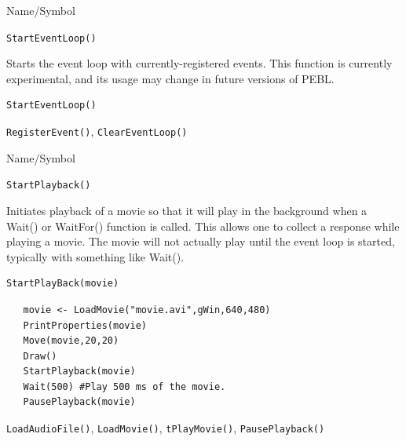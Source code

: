 \begin{desc}{Name/Symbol}
\item[Name/Symbol]  	\verb+StartEventLoop()+ 

\item[Description]  Starts the event loop with currently-registered events.  This function is currently experimental, and its usage may change in future versions of PEBL.

\item[Usage]       	
\begin{verbatim}
StartEventLoop()        
\end{verbatim}

\item[Example]	

\item[See Also] 
\verb+RegisterEvent()+, \verb+ClearEventLoop()+
\end{desc}


\begin{desc}{Name/Symbol}
\item[Name/Symbol]	\verb+StartPlayback()+
 
\item[Description] Initiates playback of a movie so that it will play in the background
when a Wait() or WaitFor() function is called.  This allows one to collect a response while 
playing a movie.  The movie will not actually play until the event loop is started, typically
with something like Wait().

\item[Usage]		
\begin{verbatim}
StartPlayBack(movie)
\end{verbatim}

\item[Example]	
\begin{verbatim}
   movie <- LoadMovie("movie.avi",gWin,640,480)
   PrintProperties(movie)
   Move(movie,20,20)
   Draw() 
   StartPlayback(movie)
   Wait(500) #Play 500 ms of the movie.
   PausePlayback(movie)
\end{verbatim}

\item[See Also] \verb+LoadAudioFile()+, \verb+LoadMovie()+, \verb+tPlayMovie()+, \verb+PausePlayback()+
\end{desc}




